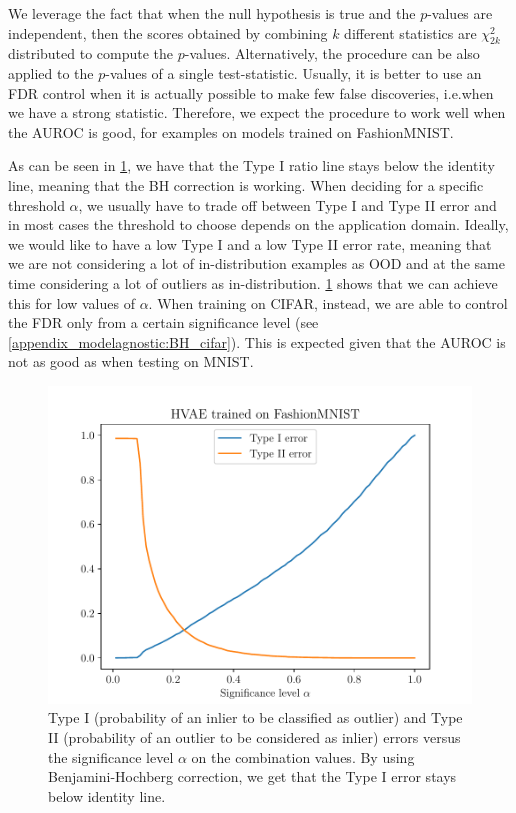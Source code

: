 {We leverage the fact that when the null hypothesis is true and the $p$-values are independent, then the scores obtained by combining $k$ different statistics are $\chi^2_{2k}$ distributed to compute the $p$-values. Alternatively, the procedure can be also applied to the $p$-values of a single test-statistic.
%
Usually, it is better to use an FDR control when it is actually possible to make few false discoveries, i.e.\@ when we have a strong statistic. Therefore, we expect the procedure to work well when the AUROC is good, for examples on models trained on FashionMNIST.

As can be seen in \cref{fig_modelagnostic:type1}, we have that the Type I ratio line stays below the identity line, meaning that the BH correction is working. When deciding for a specific threshold $\alpha$, we usually have to trade off between Type I and Type II error and in most cases the threshold to choose depends on the application domain. Ideally, we would like to have a low Type I and a low Type II error rate, meaning that we are not considering a lot of in-distribution examples as OOD and at the same time considering a lot of outliers as in-distribution. \cref{fig_modelagnostic:type1} shows that we can achieve this for low values of $\alpha$. When training on CIFAR, instead, we are able to control the FDR only from a certain significance level (see \cref{appendix_modelagnostic:BH_cifar}). This is expected given that the AUROC is not as good as when testing on MNIST.


\begin{figure}[tb]
    \centering
    \includegraphics[scale=0.6]{graphics/paper_modelagnostic/fashion_hvae_type1_correct_font.pdf}
    \caption[Type I and Type II errors versus the significance level $\alpha$ on the combination values.]{Type I (probability of an inlier to be classified as outlier) and Type II (probability of an outlier to be considered as inlier) errors versus the significance level $\alpha$ on the combination values. By using Benjamini-Hochberg correction, we get that the Type I error stays below identity line.}
    \label{fig_modelagnostic:type1}
\end{figure}


}
